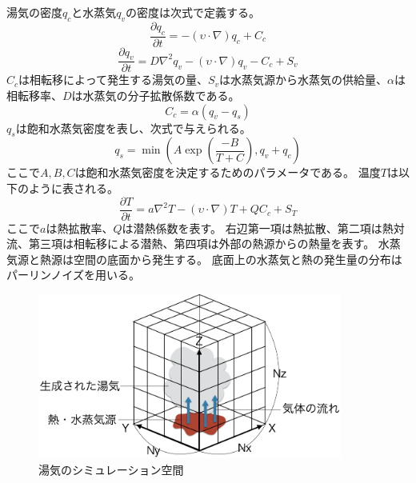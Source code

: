 湯気の密度$q_{c}$と水蒸気$q_{v}$の密度は次式で定義する。
\begin{equation}
\label{steam}
\frac{\partial q_{c}}{\partial t} = -(\upsilon \cdot \nabla)q_{c} + C_{c}
\end{equation}
\begin{equation}
\label{vapor}
\frac{\partial q_{v}}{\partial t} = D\nabla^2q_{v}-(\upsilon \cdot \nabla)q_{v} - C_{c} + S_{v}
\end{equation}
$C_{c}$は相転移によって発生する湯気の量、$S_{v}$は水蒸気源から水蒸気の供給量、$\alpha$は相転移率、$D$は水蒸気の分子拡散係数である。
\begin{equation}
\label{transition}
C_{c} = \alpha(q_{v}-q_{s})
\end{equation}
$q_{s}$は飽和水蒸気密度を表し、次式で与えられる。	
\begin{equation}
\label{saturation}
q_{s} = \min\left(A \exp\left(\frac{-B}{T+C}\right),q_{v}+q_{c}\right)
\end{equation}
ここで$A,B,C$は飽和水蒸気密度を決定するためのパラメータである。
温度$T$は以下のように表される。
\begin{equation}
\label{temperature}
\frac{\partial T}{\partial t} = a\nabla^2T- (\upsilon \cdot \nabla)T +  QC_{c} + S_{T}
\end{equation}
ここで$a$は熱拡散率、$Q$は潜熱係数を表す。
右辺第一項は熱拡散、第二項は熱対流、第三項は相転移による潜熱、第四項は外部の熱源からの熱量を表す。
水蒸気源と熱源は空間の底面から発生する。
底面上の水蒸気と熱の発生量の分布はパーリンノイズ\cite{Perlin1985}\cite{Perlin2002}を用いる。
\begin{figure}
	\begin{center}
		\includegraphics[width=100mm]{simulation.png}
		\caption{湯気のシミュレーション空間}
		\label{simulation}
	\end{center}
\end{figure}




